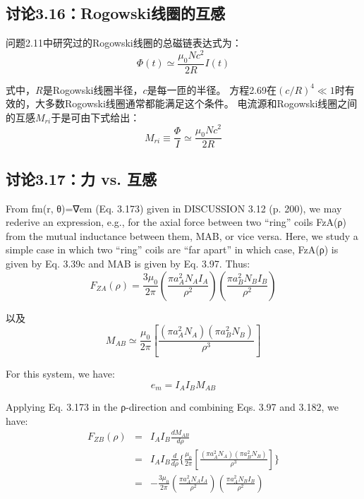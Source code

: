 \subsection{讨论3.16：Rogowski线圈的互感}
问题2.11中研究过的Rogowski线圈的总磁链表达式为：
 \begin{equation}%
\Phi(t)\simeq\frac{\mu_0Nc^2}{2R}I(t)
\end{equation}

式中，$R$是Rogowski线圈半径，$c$是每一匝的半径。
方程2.69在$(c/R)^4\ll 1$时有效的，大多数Rogowski线圈通常都能满足这个条件。
电流源和Rogowski线圈之间的互感$M_{ri}$于是可由下式给出：
\begin{equation}%
M_{ri}\equiv\frac{\Phi}{I}\simeq\frac{\mu_0Nc^2}{2R}
\end{equation}

\newpage



\subsection{讨论3.17：力 vs. 互感}
From fm(r, θ)=∇em (Eq. 3.173) given in DISCUSSION 3.12 (p. 200), we may rederive an expression, e.g., for the axial force between two “ring” coils FzA(ρ) from
the mutual inductance between them, MAB, or vice versa. Here, we study a simple
case in which two “ring” coils are “far apart” in which case, FzA(ρ) is given by
Eq. 3.39c and MAB is given by Eq. 3.97. Thus:
 \begin{equation}%
F_{ZA}(\rho)=\frac{3\mu_0}{2\pi}(\frac{\pi a_{A}^{2}N_AI_A}{\rho^2})(\frac{\pi a_{B}^{2}N_BI_B}{\rho^2})
\end{equation}

以及
\begin{equation}%
M_{AB}\simeq\frac{\mu_0}{2\pi}[\frac{(\pi a_{A}^{2}N_A)(\pi a_{B}^{2}N_B)}{\rho^3}]
\end{equation}

For this system, we have:
\begin{equation}%
e_m=I_AI_BM_{AB}
\end{equation}

Applying Eq. 3.173 in the ρ-direction and combining Eqs. 3.97 and 3.182, we have:
\begin{eqnarray}%
F_{ZB}(\rho)&=&I_A I_B\frac{dM_{AB}}{d\rho}\\
&=&I_A I_B\frac{d}{d\rho}\{\frac{\mu_0}{2\pi}[\frac{(\pi a_{A}^{2}N_A)(\pi a_{B}^{2}N_B)}{\rho^3}]\}\\
&=&-\frac{3\mu_0}{2\pi}(\frac{\pi a_{A}^{2}N_A I_A}{\rho^2})(\frac{\pi a_{A}^{2}N_B I_B}{\rho^2})
\end{eqnarray}

